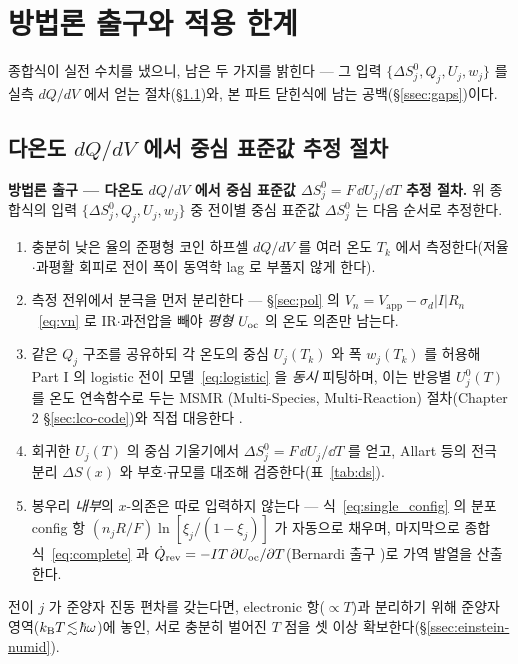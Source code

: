 \section{방법론 출구와 적용 한계}\label{sec:method}

종합식이 실전 수치를 냈으니, 남은 두 가지를 밝힌다 --- 그 입력 $\{\Delta S^0_j,Q_j,U_j,w_j\}$ 를 실측
$dQ/dV$ 에서 얻는 절차(\S\ref{ssec:procedure})와, 본 파트 닫힌식에 남는 공백(\S\ref{ssec:gaps})이다.

\subsection{다온도 $dQ/dV$ 에서 중심 표준값 추정 절차}\label{ssec:procedure}
\begin{procedurebox}
\textbf{방법론 출구 --- 다온도 $dQ/dV$ 에서 중심 표준값 $\Delta S^0_j=F\,\dd U_j/\dd T$ 추정 절차.} 위 종합식의
입력 $\{\Delta S^0_j,Q_j,U_j,w_j\}$ 중 전이별 중심 표준값 $\Delta S^0_j$ 는 다음 순서로 추정한다.
\begin{enumerate}[leftmargin=1.8em,itemsep=2pt,topsep=2pt]
\item 충분히 낮은 율의 준평형 코인 하프셀 $dQ/dV$ 를 여러 온도 $T_k$ 에서 측정한다(저율$\cdot$과평활 회피로
전이 폭이 동역학 lag 로 부풀지 않게 한다).
\item 측정 전위에서 분극을 먼저 분리한다 --- \S\ref{sec:pol} 의 $V_n=V_\mathrm{app}-\sigma_d|I|R_n$~\eqref{eq:vn} 로
IR$\cdot$과전압을 빼야 \emph{평형} $U_{\mathrm{oc}}$ 의 온도 의존만 남는다.
\item 같은 $Q_j$ 구조를 공유하되 각 온도의 중심 $U_j(T_k)$ 와 폭 $w_j(T_k)$ 를 허용해 Part I 의 logistic
전이 모델~\eqref{eq:logistic} 을 \emph{동시} 피팅하며, 이는 반응별 $U_j^0(T)$ 를 온도 연속함수로 두는 MSMR
(Multi-Species, Multi-Reaction) 절차(Chapter 2 \S\ref{sec:lco-code})와 직접 대응한다 \cite{msmr_partI,msmr_partII}.
\item 회귀한 $U_j(T)$ 의 중심 기울기에서 $\Delta S^0_j=F\,\dd U_j/\dd T$ 를 얻고, Allart 등의 전극 분리
$\Delta S(x)$ \cite{allart2018} 와 부호$\cdot$규모를 대조해 검증한다(표~\ref{tab:ds}).
\item 봉우리 \emph{내부}의 $x$-의존은 따로 입력하지 않는다 --- 식~\eqref{eq:single_config} 의 분포 config 항
$(n_jR/F)\ln[\xi_j/(1-\xi_j)]$ 가 자동으로 채우며, 마지막으로 종합식~\eqref{eq:complete} 과
$\dot Q_{\mathrm{rev}}=-IT\,\partial U_{\mathrm{oc}}/\partial T$(Bernardi 출구 \cite{bernardi1985})로 가역 발열을 산출한다.
\end{enumerate}
전이 $j$ 가 준양자 진동 편차를 갖는다면, electronic 항($\propto T$)과 분리하기 위해 준양자 영역($k_{\mathrm B}
T\!\lesssim\!\hbar\omega$)에 놓인, 서로 충분히 벌어진 $T$ 점을 셋 이상 확보한다(\S\ref{ssec:einstein-numid}).
\end{procedurebox}

